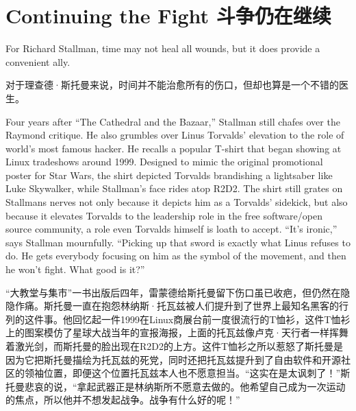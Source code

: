 

\chapter{\ifdefined\eng
Continuing the Fight
\fi
\ifdefined\chs
斗争仍在继续
\fi}

\ifdefined\eng
For Richard Stallman, time may not heal all wounds, but it does provide a convenient ally.
\fi

\ifdefined\chs
对于理查德·斯托曼来说，时间并不能治愈所有的伤口，但却也算是一个不错的医生。
\fi

\ifdefined\eng
Four years after ``The Cathedral and the Bazaar,'' Stallman still chafes over the Raymond critique. He also grumbles over Linus Torvalds' elevation to the role of world's most famous hacker. He recalls a popular T-shirt that began showing at Linux tradeshows around 1999. Designed to mimic the original promotional poster for Star Wars, the shirt depicted Torvalds brandishing a lightsaber like Luke Skywalker, while Stallman's face rides atop R2D2. The shirt still grates on Stallmans nerves not only because it depicts him as a Torvalds' sidekick, but also because it elevates Torvalds to the leadership role in the free software/open source community, a role even Torvalds himself is loath to accept. ``It's ironic,'' says Stallman mournfully. ``Picking up that sword is exactly what Linus refuses to do. He gets everybody focusing on him as the symbol of the movement, and then he won't fight. What good is it?''
\fi

\ifdefined\chs
``大教堂与集市''一书出版后四年，雷蒙德给斯托曼留下伤口虽已收疤，但仍然在隐隐作痛。斯托曼一直在抱怨林纳斯·托瓦兹被人们提升到了世界上最知名黑客的行列的这件事。他回忆起一件1999在Linux商展台前一度很流行的T恤衫，这件T恤衫上的图案模仿了星球大战当年的宣报海报，上面的托瓦兹像卢克·天行者一样挥舞着激光剑，而斯托曼的脸出现在R2D2的上方。这件T恤衫之所以惹怒了斯托曼是因为它把斯托曼描绘为托瓦兹的死党，同时还把托瓦兹提升到了自由软件和开源社区的领袖位置，即便这个位置托瓦兹本人也不愿意担当。``这实在是太讽刺了！''斯托曼悲哀的说，``拿起武器正是林纳斯所不愿意去做的。他希望自己成为一次运动的焦点，所以他并不想发起战争。战争有什么好的呢！''
\fi


